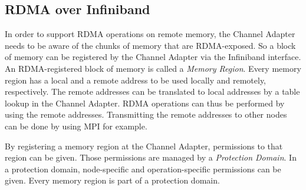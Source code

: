 \subsection{RDMA over Infiniband}
In order to support RDMA operations on remote memory, the Channel Adapter needs to be aware of the chunks of memory that are RDMA-exposed. So a block of memory can be registered by the Channel Adapter via the Infiniband interface. An RDMA-registered block of memory is called a \emph{Memory Region}. Every memory region has a local and a remote address to be used locally and remotely, respectively. The remote addresses can be translated to local addresses by a table lookup in the Channel Adapter. RDMA operations can thus be performed by using the remote addresses. Transmitting the remote addresses to other nodes can be done by using MPI for example.

By registering a memory region at the Channel Adapter, permissions to that region can be given. Those permissions are managed by a \emph{Protection Domain}. In a protection domain, node-specific and operation-specific permissions can be given. Every memory region is part of a protection domain.